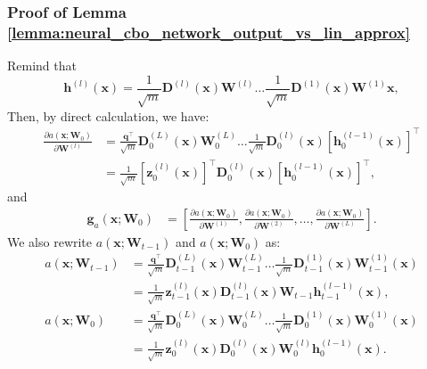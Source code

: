 \subsubsection{Proof of Lemma \ref{lemma:neural_cbo_network_output_vs_lin_approx}}


Remind that 
\begin{equation*}
    \mathbf{h}^{(l)}(\mathbf{x}) = \frac{1}{\sqrt{m}} \mathbf{D}^{(l)}(\mathbf{x}) \mathbf{W}^{(l)} \dots \frac{1}{\sqrt{m}} \mathbf{D}^{(1)}(\mathbf{x}) \mathbf{W}^{(1)} \mathbf{x},
\end{equation*}
Then, by direct calculation, we have:
\begin{align*}
 \frac{\partial a(\mathbf{x}; \mathbf{W}_0)}{\partial \mathbf{W}^{(l)}}  &= \frac{\mathbf{q}^\top}{\sqrt{m}} \mathbf{D}_0^{(L)}(\mathbf{x}) \mathbf{W}_0^{(L)} \dots \frac{1}{\sqrt{m}} \mathbf{D}_0^{(l)}(\mathbf{x}) \left[\mathbf{h}_0^{(l-1)}(\mathbf{x}) \right] ^\top
 \\
 &= \frac{1}{\sqrt{m}} [\mathbf{z}_0^{(l)}(\mathbf{x})]^\top \mathbf{D}_0^{(l)}(\mathbf{x})\left[\mathbf{h}_0^{(l-1)}(\mathbf{x}) \right] ^\top,
\end{align*}
and 
\begin{align*}
    \mathbf{g}_{a}(\mathbf{x}; \mathbf{W}_0) &= \left[ \frac{\partial a(\mathbf{x}; \mathbf{W}_0)}{\partial \mathbf{W}^{(1)}}, \frac{\partial a(\mathbf{x}; \mathbf{W}_0)}{\partial \mathbf{W}^{(2)}}, \dots, \frac{\partial a(\mathbf{x}; \mathbf{W}_0)}{\partial \mathbf{W}^{(L)}} \right].
\end{align*}
We also rewrite $a(\mathbf{x}; \mathbf{W}_{t-1})$ and $a(\mathbf{x}; \mathbf{W}_{0})$  as:
\begin{align*}
    a(\mathbf{x}; \mathbf{W}_{t-1}) &= \frac{\mathbf{q}^\top}{\sqrt{m}} \mathbf{D}_{t-1}^{(L)}(\mathbf{x}) \mathbf{W}_{t-1}^{(L)} \dots \frac{1}{\sqrt{m}} \mathbf{D}_{t-1}^{(1)}(\mathbf{x}) \mathbf{W}_{t-1}^{(1)} (\mathbf{x}) 
    \\
    & = \frac{1}{\sqrt{m}} \mathbf{z}_{t-1}^{(l)} (\mathbf{x}) \mathbf{D}_{t-1}^{(l)} (\mathbf{x}) \mathbf{W}_{t-1}  \mathbf{h}_{t-1}^{(l-1)} (\mathbf{x}),
    \\
    a(\mathbf{x}; \mathbf{W}_{0}) &= \frac{\mathbf{q}^\top}{\sqrt{m}} \mathbf{D}_{0}^{(L)}(\mathbf{x}) \mathbf{W}_{0}^{(L)} \dots \frac{1}{\sqrt{m}} \mathbf{D}_{0}^{(1)}(\mathbf{x}) \mathbf{W}_{0}^{(1)} (\mathbf{x})
    \\
    & = \frac{1}{\sqrt{m}} \mathbf{z}_{0}^{(l)} (\mathbf{x}) \mathbf{D}_{0}^{(l)} (\mathbf{x}) \mathbf{W}_{0}^{(l)}  \mathbf{h}_{0}^{(l-1)} (\mathbf{x}).
\end{align*} 

